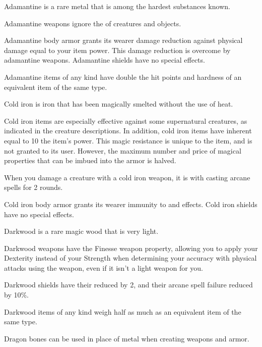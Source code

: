         Adamantine is a rare metal that is among the hardest substances known.

        Adamantine weapons ignore the  of creatures and objects.

        Adamantine body armor grants its wearer damage reduction against physical damage equal to your item power.
        This damage reduction is overcome by adamantine weapons.
        Adamantine shields have no special effects.

        Adamantine items of any kind have double the hit points and hardness of an equivalent item of the same type.


        Cold iron is iron that has been magically smelted without the use of heat.

        Cold iron items are especially effective against some supernatural creatures, as indicated in the creature descriptions.
        In addition, cold iron items have inherent  equal to 10 \add the item's power.
        This magic resistance is unique to the item, and is not granted to its user.
        However, the maximum number and price of magical properties that can be imbued into the armor is halved.

        When you damage a creature with a cold iron weapon, it is \impaired with casting arcane spells for 2 rounds.

        Cold iron body armor grants its wearer immunity to  and  effects.
        Cold iron shields have no special effects.

        Darkwood is a rare magic wood that is very light.

        Darkwood weapons have the Finesse weapon property, allowing you to apply your Dexterity instead of your Strength when determining your accuracy with physical attacks using the weapon, even if it isn't a light weapon for you.

        Darkwood shields have their  reduced by 2, and their arcane spell failure reduced by 10\%.

        Darkwood items of any kind weigh half as much as an equivalent item of the same type.


        Dragon bones can be used in place of metal when creating weapons and armor.

